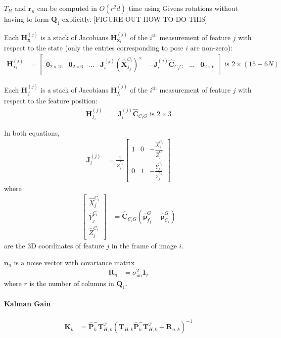 \documentclass[10pt,letterpaper,fleqn,oneside]{article}
\newcommand{\nl}{\\[0.5em]}
\def\Vec#1{\mathbf{#1}} %
\newcommand{\bbm}{\begin{bmatrix}}
\newcommand{\ebm}{\end{bmatrix}}
\begin{document}
$T_H$ and $\Vec{r}_n$ can be computed in $O(r^2d)$ time using Givens rotations without having to form $\Vec{Q}_1$ explicitly. [FIGURE OUT HOW TO DO THIS]

Each $\Vec{H}^{(j)}_\Vec{x}$ is a stack of Jacobians $\Vec{H}^{(j)}_{\Vec{x}_i}$ of the $i^\text{th}$ measurement of feature $j$ with respect to the state (only the entries corresponding to pose $i$ are non-zero):
\begin{align}
\Vec{H}^{(j)}_{\Vec{x}_i} &= \bbm \Vec{0}_{2\times15} & \Vec{0}_{2\times6} & \hdots & \Vec{J}^{\left(j\right)}_i \left(\hat{\Vec{X}}^{C_i}_{f_j}\right)^\times & -\Vec{J}^{\left(j\right)}_i \hat{\Vec{C}}_{C_i G} & \hdots & \Vec{0}_{2\times6} \ebm \text{ is } 2\times\left(15 + 6N\right)
\end{align}

Each $\Vec{H}^{(j)}_f$ is a stack of Jacobians $\Vec{H}^{(j)}_{f_i}$ of the $i^\text{th}$ measurement of feature $j$ with respect to the feature position:
\begin{align}
\Vec{H}^{(j)}_{f_i} &= \Vec{J}^{\left(j\right)}_i \hat{\Vec{C}}_{C_i G}  \text{ is } 2\times3
\end{align}

In both equations,
\begin{align}
\Vec{J}^{\left(j\right)}_i &= \frac{1}{\hat{Z}^{C_i}_j}
\bbm 1 & 0 & -\frac{\hat{X}^{C_i}_j}{\hat{Z}^{C_i}_j} \nl
		 0 & 1 & -\frac{\hat{Y}^{C_i}_j}{\hat{Z}^{C_i}_j}
\ebm
\end{align}
where 
\begin{align}
\bbm \hat{X}^{C_i}_j \nl \hat{Y}^{C_i}_j \nl \hat{Z}^{C_i}_j \ebm &= \hat{\Vec{C}}_{C_i G} \left(\hat{\Vec{p}}^G_{f_j} - \hat{\Vec{p}}^G_{C_i} \right)
\end{align}
are the 3D coordinates of feature $j$ in the frame of image $i$.

$\Vec{n}_n$ is a noise vector with covariance matrix
\begin{align}
\Vec{R}_n &= \sigma^2_{\text{im}} \Vec{1}_r
\end{align}
where $r$ is the number of columns in $\Vec{Q}_1$.
\newpage
\paragraph{Kalman Gain}
\begin{align}
\Vec{K}_k &= \hat{\Vec{P}}^-_k\Vec{T}_{H,k}^T\left(\Vec{T}_{H,k}\hat{\Vec{P}}^-_k\Vec{T}_{H,k}^T + \Vec{R}_{n,k} \right)^{-1}
\end{align}
\end{document}

